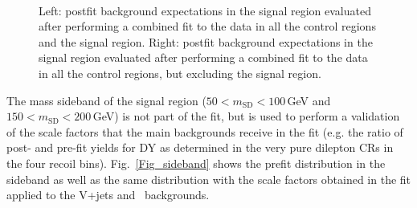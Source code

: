 \begin{figure}
\centering
  \\
\caption{Left: postfit background expectations in the signal region evaluated after performing a combined fit to the data in all the control regions and the signal region. Right: postfit background expectations in the signal region evaluated after performing a combined fit to the data in all the control regions, but excluding the signal region.}
\label{Fig_postfit_3}
\end{figure}

The mass sideband of the signal region ($50<m_{\text{SD}}<100$\,GeV and $150<m_{\text{SD}}<200$\,GeV) is not part of the fit, but is used to perform a validation of the scale factors that the main backgrounds receive in the fit (e.g. the ratio of post- and pre-fit yields for DY as determined in the very pure dilepton CRs in the four recoil bins). Fig.~\ref{Fig_sideband} shows the prefit \ptmiss distribution in the sideband as well as the same distribution with the scale factors obtained in the fit applied to the V+jets and \ttbar~backgrounds. 


